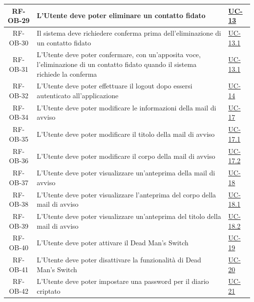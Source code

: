 \documentclass[a4paper,12pt]{article}
\begin{document}
\begin{center}
\begin{longtable}{|c|p{8.5cm}|>{\centering\arraybackslash}p{4cm}|}
RF-OB-29 & L'Utente deve poter eliminare un contatto fidato & \hyperref[subsec:UC-13]{UC-13} \\
\hline

RF-OB-30 & Il sistema deve richiedere conferma prima dell'eliminazione di un contatto fidato & \hyperref[subsec:UC-13.1]{UC-13.1} \\
\hline

RF-OB-31 & L'Utente deve poter confermare, con un'apposita voce, l'eliminazione di un contatto fidato quando il sistema richiede la conferma & \hyperref[subsec:UC-13.1]{UC-13.1} \\
\hline

RF-OB-32 & L'Utente deve poter effettuare il logout dopo essersi autenticato all'applicazione & \hyperref[subsec:UC-14]{UC-14} \\
\hline

RF-OB-34 & L'Utente deve poter modificare le informazioni della mail di avviso & \hyperref[sec:UC-17]{UC-17} \\
\hline

RF-OB-35 & L'Utente deve poter modificare il titolo della mail di avviso & \hyperref[sec:UC-17.1]{UC-17.1} \\
\hline

RF-OB-36 & L'Utente deve poter modificare il corpo della mail di avviso & \hyperref[sec:UC-17.2]{UC-17.2} \\
\hline

RF-OB-37 & L'Utente deve poter visualizzare un'anteprima della mail di avviso & \hyperref[sec:UC-18]{UC-18} \\
\hline

RF-OB-38 & L'Utente deve poter visualizzare l'anteprima del corpo della mail di avviso & \hyperref[subsec:UC-18.1]{UC-18.1} \\
\hline

RF-OB-39 & L'Utente deve poter visualizzare un'anteprima del titolo della mail di avviso & \hyperref[subsec:UC-18.2]{UC-18.2} \\
\hline

RF-OB-40 & L'Utente deve poter attivare il Dead Man's Switch & \hyperref[sec:UC-19]{UC-19} \\
\hline

RF-OB-41 & L'Utente deve poter disattivare la funzionalità di Dead Man's Switch & \hyperref[sec:UC-20]{UC-20} \\
\hline

RF-OB-42 & L'Utente deve poter impostare una password per il diario criptato & \hyperref[subsec:UC-21]{UC-21} \\
\hline


\end{longtable}
\end{center}
\end{document}
